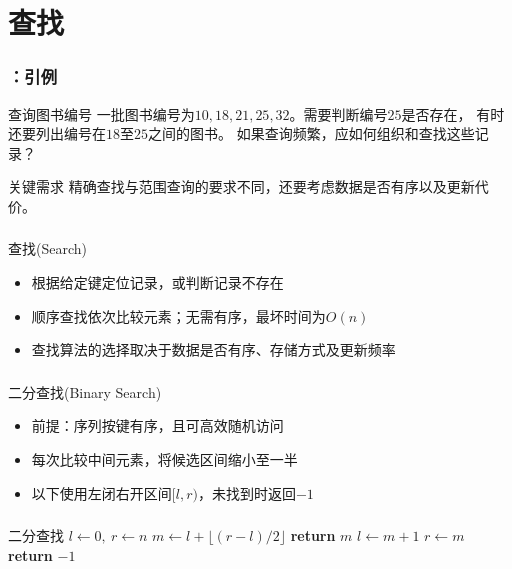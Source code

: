\section{查找}

\begin{frame}
    \frametitle{\insertsectionhead：引例}
    \begin{exampleblock}{查询图书编号}
        一批图书编号为$10,18,21,25,32$。需要判断编号$25$是否存在，
        有时还要列出编号在$18$至$25$之间的图书。
        如果查询频繁，应如何组织和查找这些记录？
    \end{exampleblock}
    \begin{block}{关键需求}
        精确查找与范围查询的要求不同，还要考虑数据是否有序以及更新代价。
    \end{block}
\end{frame}

\begin{frame}
    \frametitle{\insertsectionhead}
    \begin{block}{查找(Search)}
        \begin{itemize}
            \item 根据给定键定位记录，或判断记录不存在
            \item 顺序查找依次比较元素；无需有序，最坏时间为$O(n)$
            \item 查找算法的选择取决于数据是否有序、存储方式及更新频率
        \end{itemize}
    \end{block}
\end{frame}

\begin{frame}
    \frametitle{\insertsectionhead}
    \begin{block}{二分查找(Binary Search)}
        \begin{itemize}
            \item 前提：序列按键有序，且可高效随机访问
            \item 每次比较中间元素，将候选区间缩小至一半
            \item 以下使用左闭右开区间$[l,r)$，未找到时返回$-1$
        \end{itemize}
    \end{block}
\end{frame}

\begin{fragile}
    \frametitle{\insertsectionhead}
    \begin{algorithmx}{二分查找}
        \State $l\gets 0,\ r\gets n$
        \State $m\gets l+\lfloor(r-l)/2\rfloor$
        \State \textbf{return} $m$
        \State $l\gets m+1$
        \Else
        \State $r\gets m$
        \EndIf
        \EndWhile
        \State \textbf{return} $-1$
        \EndProcedure
    \end{algorithmx}
\end{fragile}

